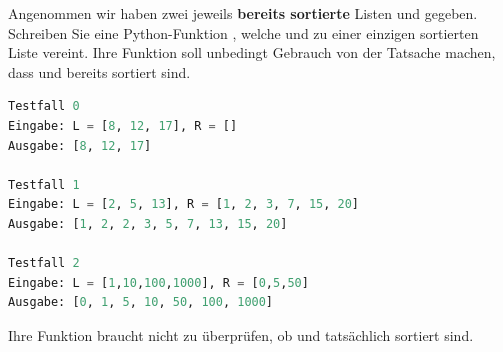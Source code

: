 \begin{myexercise}\label{myexercise:0501}
	Angenommen wir haben zwei jeweils \textbf{bereits sortierte} Listen  und  gegeben. Schreiben Sie eine Python-Funktion , welche  und  zu einer einzigen sortierten Liste vereint. Ihre Funktion soll unbedingt Gebrauch von der Tatsache machen, dass  und  bereits sortiert sind.
	\begin{lstlisting}[language=Python,caption=Testfälle für die Funktion \pythoninline{merge},numbers=none]
Testfall 0
Eingabe: L = [8, 12, 17], R = []
Ausgabe: [8, 12, 17]

Testfall 1
Eingabe: L = [2, 5, 13], R = [1, 2, 3, 7, 15, 20]
Ausgabe: [1, 2, 2, 3, 5, 7, 13, 15, 20]

Testfall 2
Eingabe: L = [1,10,100,1000], R = [0,5,50]
Ausgabe: [0, 1, 5, 10, 50, 100, 1000]
\end{lstlisting}
	Ihre Funktion braucht nicht zu überprüfen, ob  und  tatsächlich sortiert sind.
\end{myexercise}

